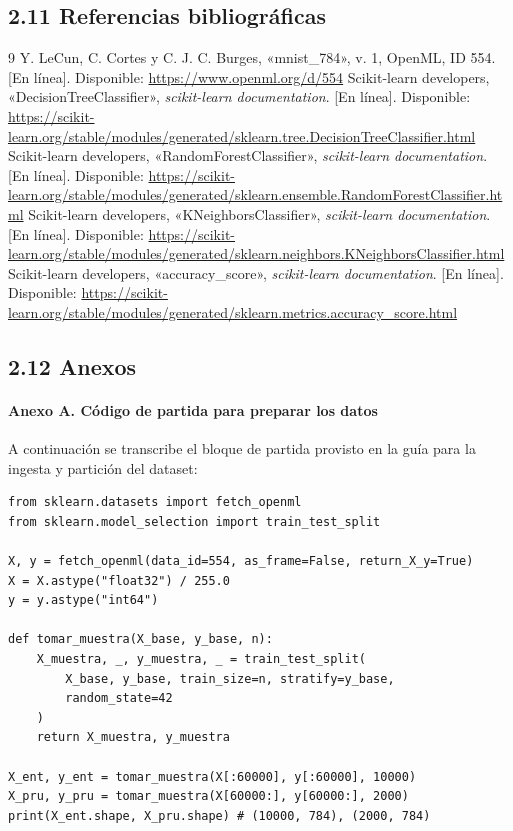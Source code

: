 \documentclass[11pt,a4paper]{article}
\begin{document}
\subsection*{2.11 Referencias bibliográficas}
\begin{thebibliography}{9}
 Y. LeCun, C. Cortes y C. J. C. Burges, «mnist\_784», v. 1, OpenML, ID 554. [En línea]. Disponible: \url{https://www.openml.org/d/554}
 Scikit-learn developers, «DecisionTreeClassifier», \textit{scikit-learn documentation}. [En línea]. Disponible: \url{https://scikit-learn.org/stable/modules/generated/sklearn.tree.DecisionTreeClassifier.html}
 Scikit-learn developers, «RandomForestClassifier», \textit{scikit-learn documentation}. [En línea]. Disponible: \url{https://scikit-learn.org/stable/modules/generated/sklearn.ensemble.RandomForestClassifier.html}
 Scikit-learn developers, «KNeighborsClassifier», \textit{scikit-learn documentation}. [En línea]. Disponible: \url{https://scikit-learn.org/stable/modules/generated/sklearn.neighbors.KNeighborsClassifier.html}
 Scikit-learn developers, «accuracy\_score», \textit{scikit-learn documentation}. [En línea]. Disponible: \url{https://scikit-learn.org/stable/modules/generated/sklearn.metrics.accuracy_score.html}
\end{thebibliography}

\subsection*{2.12 Anexos}

\paragraph{Anexo A. Código de partida para preparar los datos}
A continuación se transcribe el bloque de partida provisto en la guía para la ingesta y partición del dataset:

\begin{lstlisting}
from sklearn.datasets import fetch_openml
from sklearn.model_selection import train_test_split

X, y = fetch_openml(data_id=554, as_frame=False, return_X_y=True)
X = X.astype("float32") / 255.0
y = y.astype("int64")

def tomar_muestra(X_base, y_base, n):
    X_muestra, _, y_muestra, _ = train_test_split(
        X_base, y_base, train_size=n, stratify=y_base,
        random_state=42
    )
    return X_muestra, y_muestra

X_ent, y_ent = tomar_muestra(X[:60000], y[:60000], 10000)
X_pru, y_pru = tomar_muestra(X[60000:], y[60000:], 2000)
print(X_ent.shape, X_pru.shape) # (10000, 784), (2000, 784)
\end{lstlisting}
\end{document}
